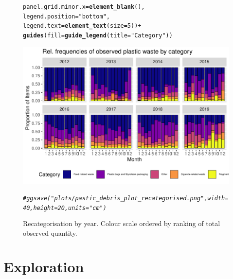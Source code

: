 \documentclass[10pt]{article}\usepackage[]{graphicx}\usepackage[]{color}
\makeatletter
\newcommand{\hlnum}[1]{\textcolor[rgb]{0.686,0.059,0.569}{#1}}%
\newcommand{\hlstr}[1]{\textcolor[rgb]{0.192,0.494,0.8}{#1}}%
\newcommand{\hlcom}[1]{\textcolor[rgb]{0.678,0.584,0.686}{\textit{#1}}}%
\newcommand{\hlopt}[1]{\textcolor[rgb]{0,0,0}{#1}}%
\newcommand{\hlstd}[1]{\textcolor[rgb]{0.345,0.345,0.345}{#1}}%
\newcommand{\hlkwc}[1]{\textcolor[rgb]{0.333,0.667,0.333}{#1}}%
\newcommand{\hlkwd}[1]{\textcolor[rgb]{0.737,0.353,0.396}{\textbf{#1}}}%
\newenvironment{kframe}{%
 \def\at@end@of@kframe{}%
 \ifinner\ifhmode%
  \def\at@end@of@kframe{\end{minipage}}%
  \begin{minipage}{\columnwidth}%
 \fi\fi%
 \def\FrameCommand##1{\hskip\@totalleftmargin \hskip-\fboxsep
 \colorbox{shadecolor}{##1}\hskip-\fboxsep
     \hskip-\linewidth \hskip-\@totalleftmargin \hskip\columnwidth}%
 \MakeFramed {\advance\hsize-\width
   \@totalleftmargin\z@ \linewidth\hsize
   \@setminipage}}%
 {\par\unskip\endMakeFramed%
 \at@end@of@kframe}
\newenvironment{knitrout}{}{} %
\makeatother
\begin{document}
\begin{figure}[H]
\begin{center}
\begin{knitrout}
\begin{kframe}
\begin{alltt}
          \hlkwc{panel.grid.minor.x} \hlstd{=} \hlkwd{element_blank}\hlstd{(),}
          \hlkwc{legend.position} \hlstd{=} \hlstr{"bottom"}\hlstd{,}
          \hlkwc{legend.text}\hlstd{=}\hlkwd{element_text}\hlstd{(}\hlkwc{size}\hlstd{=}\hlnum{5}\hlstd{))} \hlopt{+}
    \hlkwd{guides}\hlstd{(}\hlkwc{fill}\hlstd{=}\hlkwd{guide_legend}\hlstd{(}\hlkwc{title}\hlstd{=}\hlstr{"Category"}\hlstd{))}
\end{alltt}
\end{kframe}
\includegraphics[width=1\linewidth]{figure/unnamed-chunk-11-1} 
\begin{kframe}\begin{alltt}
\hlcom{#ggsave("plots/pastic_debris_plot_recategorised.png", width = 40, height = 20, units = "cm")}
\end{alltt}
\end{kframe}
\end{knitrout}
\caption {Recategorisation by year. Colour scale ordered by ranking of total observed quantity.}
\label{figB}
\end {center}
\end {figure}


















\pagebreak
\section{Exploration}
\end{document}
